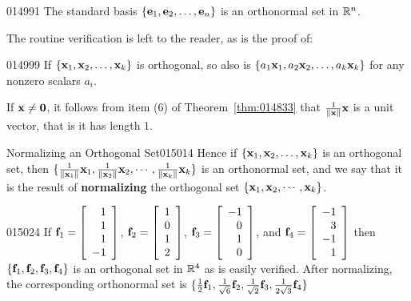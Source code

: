 \begin{example}{}{014991}
The standard basis $\{\textbf{e}_{1}, \textbf{e}_{2}, \dots, \textbf{e}_{n}\}$ is an orthonormal set in $\mathbb{R}^n$.
\end{example}

The routine verification is left to the reader, as is the proof of:

\begin{example}{}{014999}
If $\{\textbf{x}_{1}, \textbf{x}_{2}, \dots, \textbf{x}_{k}\}$ is orthogonal, so also is $\{a_{1}\textbf{x}_{1}, a_{2}\textbf{x}_{2}, \dots, a_{k}\textbf{x}_{k}\}$ for any nonzero scalars $a_{i}$.
\end{example}

If $\textbf{x} \neq \textbf{0}$, it follows from item (6) of Theorem~\ref{thm:014833} that $\tfrac{1}{\|\textbf{x}\|}\textbf{x}$ is a unit vector, that is it has length $1$.

\begin{definition}{Normalizing an Orthogonal Set}{015014} %
Hence if $\{\textbf{x}_{1}, \textbf{x}_{2}, \dots, \textbf{x}_{k}\}$ is an orthogonal set, then
$\{ \tfrac{1}{\|\textbf{x}_1\|}\textbf{x}_1,  
\tfrac{1}{\|\textbf{x}_2\|}\textbf{x}_2, \cdots, 
\tfrac{1}{\|\textbf{x}_k\|}\textbf{x}_k \}$
 is an orthonormal set, and we say that it is the result of \textbf{normalizing} the orthogonal set $\{\textbf{x}_{1}, \textbf{x}_{2}, \cdots, \textbf{x}_{k}\}$.
\end{definition}

\begin{example}{}{015024}
If
$\textbf{f}_1 = 
\left[ \begin{array}{r}
1 \\
1 \\
1 \\
-1
\end{array} \right]$, $\textbf{f}_2 =
\left[ \begin{array}{r}
1 \\
0 \\
1 \\
2
\end{array} \right]$, $\textbf{f}_3 =
\left[ \begin{array}{r}
-1 \\
0 \\
1 \\
0
\end{array} \right]$, and $\textbf{f}_4 =
\left[ \begin{array}{r}
-1 \\
3 \\
-1 \\
1
\end{array} \right]$
then $\{ \textbf{f}_1, \textbf{f}_2, \textbf{f}_3, \textbf{f}_4 \}$ is an orthogonal set in $\mathbb{R}^4$ as is easily verified. After normalizing, the corresponding orthonormal set is $\{ \tfrac{1}{2}\textbf{f}_1, \tfrac{1}{\sqrt{6}}\textbf{f}_2, \tfrac{1}{\sqrt{2}}\textbf{f}_3, \tfrac{1}{2\sqrt{3}}\textbf{f}_4 \}$
\end{example}


